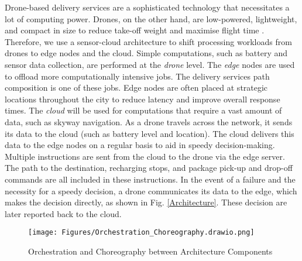 \documentclass[conference]{IEEEtran}
\begin{document}
Drone-based delivery services are a sophisticated technology that necessitates a lot of computing power. Drones, on the other hand, are low-powered, lightweight, and compact in size to reduce take-off weight and maximise flight time \cite{genc2017flying}. Therefore, we use a sensor-cloud architecture to shift processing workloads from drones to edge nodes and the cloud. Simple computations, such as battery and sensor data collection, are performed at the \textit{drone} level. The \textit{edge} nodes are used to offload more computationally intensive jobs. The delivery services path composition is one of these jobs. Edge nodes are often placed at strategic locations throughout the city to reduce latency and improve overall response times. The \textit{cloud} will be used for computations that require a vast amount of data, such as skyway navigation. As a drone travels across the network, it sends its data to the cloud (such as battery level and location). The cloud delivers this data to the edge nodes on a regular basis to aid in speedy decision-making. Multiple instructions are sent from the cloud to the drone via the edge server. The path to the destination, recharging stops, and package pick-up and drop-off commands are all included in these instructions. In the event of a failure and the necessity for a speedy decision, a drone communicates its data to the edge, which makes the decision directly, as shown in Fig. \ref{Architecture}. These decision are later reported back to the cloud. %

\begin{figure} [htp!]
    \centering
    \texttt{[image: Figures/Orchestration\_Choreography.drawio.png]}
    \caption{Orchestration and Choreography between Architecture Components}
    \label{orchestration}
\end{figure}
\end{document}
